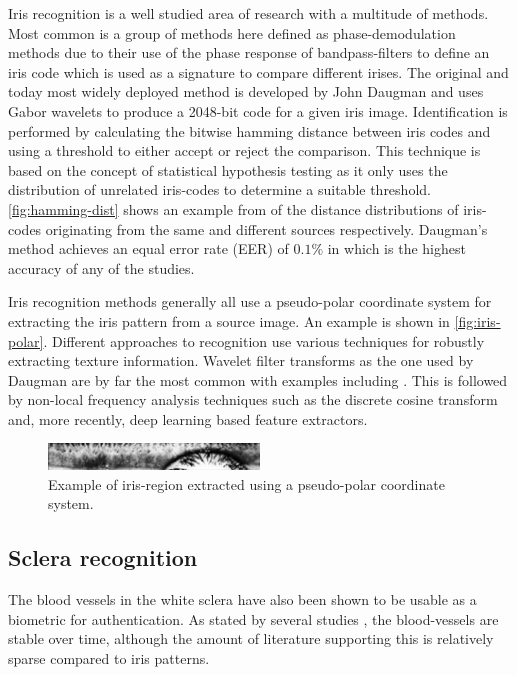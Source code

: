 Iris recognition is a well studied area of research with a multitude of methods. Most common is a group of methods here defined as phase-demodulation methods due to their use of the phase response of bandpass-filters to define an iris code which is used as a signature to compare different irises. The original and today most widely deployed method is developed by John Daugman and uses Gabor wavelets to produce a 2048-bit code for a given iris image\parencite{DAUGMAN_IRIS_ORIG}. Identification is performed by calculating the bitwise hamming distance between iris codes and using a threshold to either accept or reject the comparison. This technique is based on the concept of statistical hypothesis testing as it only uses the distribution of unrelated iris-codes to determine a suitable threshold. \cref{fig:hamming-dist} shows an example from \parencite{DAUGMAN_IRIS_ORIG} of the distance distributions of iris-codes originating from the same and different sources respectively. Daugman's method achieves an equal error rate (EER) of $0.1\%$ in \parencite{DAUGMAN_NEW} which is the highest accuracy of any of the studies.

Iris recognition methods generally all use a pseudo-polar coordinate system for extracting the iris pattern from a source image. An example is shown in \autoref{fig:iris-polar}. Different approaches to recognition use various techniques for robustly extracting texture information. Wavelet filter transforms as the one used by Daugman are by far the most common with examples including \parencite{DAUGMAN_NEW, ma2002iris, ma2004efficient, poursaberi2006iris, rydgren2004iris, zhu2000biometric}. This is followed by non-local frequency analysis techniques such as the discrete cosine transform \parencite{monroDCTBasedIrisRecognition2007, monroDCTBasedIrisRecognition2007} and, more recently, deep learning based feature extractors\cite{gangwar2016deepirisnet, nguyen2017iris}.

\begin{figure}
	\centering
	\includegraphics[width=0.5\textwidth]{figures/iris-polar}
	\caption{Example of iris-region extracted using a pseudo-polar coordinate system.}\label{fig:iris-polar}
\end{figure}

\subsection{Sclera recognition}
The blood vessels in the white sclera have also been shown to be usable as a biometric for authentication. As stated by several studies \parencite{das2013sclera, zhou2011new}, the blood-vessels are stable over time, although the amount of literature supporting this is relatively sparse compared to iris patterns.

